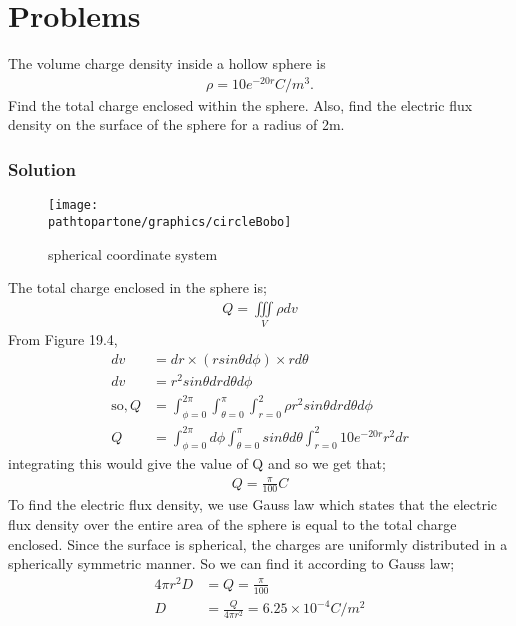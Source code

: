 \section{Problems}
\begin{exmp}
The volume charge density inside a hollow sphere is 
\begin{align*}
\rho=10e^{-20r} C/m^{3}.
\end{align*}
Find the total charge enclosed within the sphere. Also, find the electric flux density on the surface of the sphere for a radius of 2m.

\subsubsection*{Solution}
\begin{figure}[h]
\centering
\texttt{[image: \\pathtopartone/graphics/circleBobo]}
\caption{spherical coordinate system}
\end{figure} 

The total charge enclosed in the sphere is;
\begin{align*}
Q=\iiint\limits_V\rho dv
\end{align*}
From Figure 19.4, 
\begin{align*}
dv &= dr\times(rsin\theta d\phi)\times rd\theta \\
dv&=r^{2}sin\theta drd\theta d\phi\\
\text{so}, Q&=\int^{2\pi}_{\phi=0}\int^{\pi}_{\theta=0}\int^{2}_{r=0} \rho r^{2}sin\theta drd\theta d\phi\\
Q&= \int^{2\pi}_{\phi=0}d\phi\int^{\pi}_{\theta=0}sin\theta d\theta\int^{2}_{r=0}10e^{-20r}r^{2}dr
\end{align*}
integrating this would give the value of Q and so we get that;
\begin{align*}
Q=\frac{\pi}{100} C
\end{align*}
To find the electric flux density, we use Gauss law which states that the electric flux density over the entire area of the sphere is equal to the total charge enclosed. Since the surface is spherical, the charges are uniformly distributed in a spherically symmetric manner. So we can find it according to Gauss law;
\begin{align*}
4\pi r^{2}D&=Q=\frac{\pi}{100}\\
D&=\frac{Q}{4\pi r^{2}}= 6.25\times10^{-4} C/m^{2}
\end{align*}
\end{exmp}

